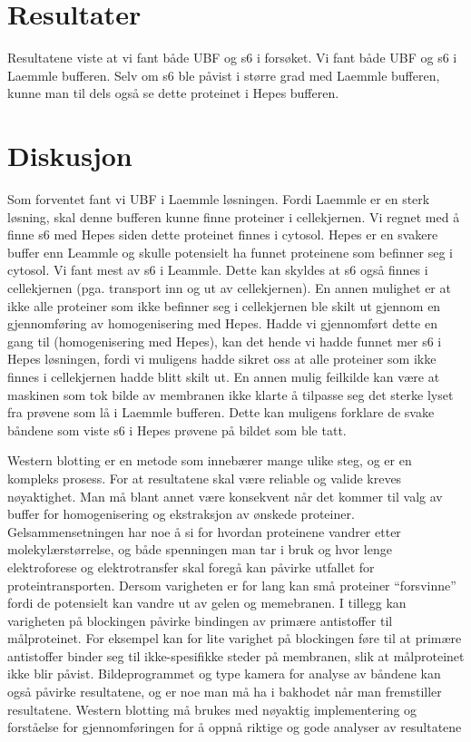 \documentclass[
]{book}
\begin{document}
\hypertarget{resultater}{%
\section{Resultater}\label{resultater}}

Resultatene viste at vi fant både UBF og s6 i forsøket. Vi fant både UBF og s6 i Laemmle bufferen. Selv om s6 ble påvist i større grad med Laemmle bufferen, kunne man til dels også se dette proteinet i Hepes bufferen.

\hypertarget{diskusjon}{%
\section{Diskusjon}\label{diskusjon}}

Som forventet fant vi UBF i Laemmle løsningen. Fordi Laemmle er en sterk løsning, skal denne bufferen kunne finne proteiner i cellekjernen. Vi regnet med å finne s6 med Hepes siden dette proteinet finnes i cytosol. Hepes er en svakere buffer enn Leammle og skulle potensielt ha funnet proteinene som befinner seg i cytosol. Vi fant mest av s6 i Leammle. Dette kan skyldes at s6 også finnes i cellekjernen (pga. transport inn og ut av cellekjernen). En annen mulighet er at ikke alle proteiner som ikke befinner seg i cellekjernen ble skilt ut gjennom en gjennomføring av homogenisering med Hepes. Hadde vi gjennomført dette en gang til (homogenisering med Hepes), kan det hende vi hadde funnet mer s6 i Hepes løsningen, fordi vi muligens hadde sikret oss at alle proteiner som ikke finnes i cellekjernen hadde blitt skilt ut. En annen mulig feilkilde kan være at maskinen som tok bilde av membranen ikke klarte å tilpasse seg det sterke lyset fra prøvene som lå i Laemmle bufferen. Dette kan muligens forklare de svake båndene som viste s6 i Hepes prøvene på bildet som ble tatt.

Western blotting er en metode som innebærer mange ulike steg, og er en kompleks prosess. For at resultatene skal være reliable og valide kreves nøyaktighet. Man må blant annet være konsekvent når det kommer til valg av buffer for homogenisering og ekstraksjon av ønskede proteiner. Gelsammensetningen har noe å si for hvordan proteinene vandrer etter molekylærstørrelse, og både spenningen man tar i bruk og hvor lenge elektroforese og elektrotransfer skal foregå kan påvirke utfallet for proteintransporten. Dersom varigheten er for lang kan små proteiner ``forsvinne'' fordi de potensielt kan vandre ut av gelen og memebranen. I tillegg kan varigheten på blockingen påvirke bindingen av primære antistoffer til målproteinet. For eksempel kan for lite varighet på blockingen føre til at primære antistoffer binder seg til ikke-spesifikke steder på membranen, slik at målproteinet ikke blir påvist. Bildeprogrammet og type kamera for analyse av båndene kan også påvirke resultatene, og er noe man må ha i bakhodet når man fremstiller resultatene. Western blotting må brukes med nøyaktig implementering og forståelse for gjennomføringen for å oppnå riktige og gode analyser av resultatene \citep{bass2017}
\end{document}
